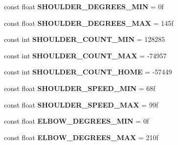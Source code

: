 \begin{DoxyCompactItemize}
\item 
\mbox{\label{class_scorbot_e_r_i_x_abf5def60bf51e7f5dafb62c7ee4be5b0}} 
const float {\bfseries S\+H\+O\+U\+L\+D\+E\+R\+\_\+\+D\+E\+G\+R\+E\+E\+S\+\_\+\+M\+IN} = 0f
\item 
\mbox{\label{class_scorbot_e_r_i_x_ae2ec88d4bbc6e616043a829d44af60fc}} 
const float {\bfseries S\+H\+O\+U\+L\+D\+E\+R\+\_\+\+D\+E\+G\+R\+E\+E\+S\+\_\+\+M\+AX} = 145f
\item 
\mbox{\label{class_scorbot_e_r_i_x_afb9e614c6e3c1ad3e4a837431da57baa}} 
const int {\bfseries S\+H\+O\+U\+L\+D\+E\+R\+\_\+\+C\+O\+U\+N\+T\+\_\+\+M\+IN} = 128285
\item 
\mbox{\label{class_scorbot_e_r_i_x_a5aea6e74f6106645659af6277b7985d9}} 
const int {\bfseries S\+H\+O\+U\+L\+D\+E\+R\+\_\+\+C\+O\+U\+N\+T\+\_\+\+M\+AX} = -\/74957
\item 
\mbox{\label{class_scorbot_e_r_i_x_a37670e096b48f9a8e208f62e8251a63a}} 
const int {\bfseries S\+H\+O\+U\+L\+D\+E\+R\+\_\+\+C\+O\+U\+N\+T\+\_\+\+H\+O\+ME} = -\/57449
\item 
\mbox{\label{class_scorbot_e_r_i_x_a93c70776a83323ff29435e128a4dc9e1}} 
const float {\bfseries S\+H\+O\+U\+L\+D\+E\+R\+\_\+\+S\+P\+E\+E\+D\+\_\+\+M\+IN} = 68f
\item 
\mbox{\label{class_scorbot_e_r_i_x_ac954f63aedcf1340b4d1ecd95d8f5a0c}} 
const float {\bfseries S\+H\+O\+U\+L\+D\+E\+R\+\_\+\+S\+P\+E\+E\+D\+\_\+\+M\+AX} = 99f
\item 
\mbox{\label{class_scorbot_e_r_i_x_a7e345c8cb678ece3c4b4976d2b7a4c97}} 
const float {\bfseries E\+L\+B\+O\+W\+\_\+\+D\+E\+G\+R\+E\+E\+S\+\_\+\+M\+IN} = 0f
\item 
\mbox{\label{class_scorbot_e_r_i_x_a3ea2ead702e1e405597f075adec13756}} 
const float {\bfseries E\+L\+B\+O\+W\+\_\+\+D\+E\+G\+R\+E\+E\+S\+\_\+\+M\+AX} = 210f
\item 
\mbox{\label{class_scorbot_e_r_i_x_a0b49ee03e8097f6e7d1dd716c6c8d880}} 

\end{DoxyCompactItemize}
